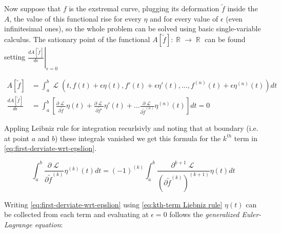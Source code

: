 \documentclass[a4paper]{article}
\DeclareMathOperator{\Lagr}{\mathcal{L}} %
\DeclareMathOperator{\R}{\mathbb{R}} %
\begin{document}
  Now suppose that $f$ is the exstremal curve, plugging its deformation
  $\tilde{f}$ inside the $A$, the value of this functional rise for every
  $\eta$ and for every value of $\epsilon$ (even infinitesimal ones), so the
  whole problem can be solved using basic single-variable calculus.
  The sationary point of the functional $A[\tilde{f}]: \R \rightarrow \R$
  can be found setting
  $\left. \frac{dA[\tilde{f}]}{d\epsilon} \right \rvert_{\epsilon=0}$

  \begin{align}
    A[\tilde{f}] &=
    \int_{a}^{b} \Lagr(t, f(t) + \epsilon\eta(t), f'(t) + \epsilon\eta'(t),
    \ldots, f^{(n)}(t) + \epsilon\eta^{(n)}(t)) dt \\
    \frac{dA[\tilde{f}]}{d\epsilon} &= \int_{a}^{b} \left[
    \frac{\partial\Lagr}{\partial\tilde{f}}\eta(t) +
    \frac{\partial\Lagr}{\partial\tilde{f}'}\eta'(t) + \ldots
    \frac{\partial\Lagr}{\partial\tilde{f}^{(n)}}\eta^{(n)}(t) \right] dt = 0
    \label{eq:first-derviate-wrt-epslion}
  \end{align}

  Appling Leibniz rule for integration recurlsivly and noting that at boundary
  (i.e. at point $a$ and $b$) these integrals vanished we get this formula for
  the $k^{th}$ term in \eqref{eq:first-derviate-wrt-epslion}.

  \begin{equation} \label{eq:kth-term Liebniz rule}
    \int_{a}^{b} \frac{\partial\Lagr}{\partial\tilde{f}^{(k)}}\eta^{(k)}(t) dt
    = (-1)^{(k)}\int_{a}^{b}
    \frac{\partial^{k+1}\Lagr}{(\partial\tilde{f}^{(k)})^{(k+1)}}\eta(t) dt
  \end{equation}

  Writing \eqref{eq:first-derviate-wrt-epslion} using \eqref{eq:kth-term Liebniz
  rule} $\eta(t)$ can be collected from each term and evaluating at $\epsilon=0$
  follows the \emph{generalized Euler-Lagrange equation}:

  \begin{equation}
    \
  \end{equation}
\end{document}
